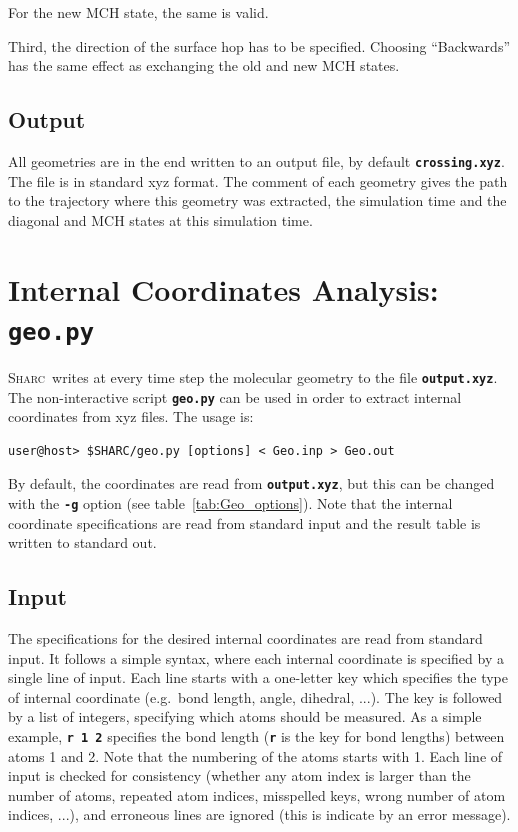 \documentclass[a4paper,10pt,DIV=15,openany]{scrbook}
\newcommand{\sharc}{\textsc{Sharc}}
\newcommand{\ttt}[1]{\textbf{\texttt{#1}}}
\begin{document}
For the new MCH state, the same is valid.

Third, the direction of the surface hop has to be specified. Choosing ``Backwards'' has the same effect as exchanging the old and new MCH states. 

\subsection{Output}

All geometries are in the end written to an output file, by default \ttt{crossing.xyz}. The file is in standard xyz format. The comment of each geometry gives the path to the trajectory where this geometry was extracted, the simulation time and the diagonal and MCH states at this simulation time. 







\section{Internal Coordinates Analysis: \ttt{geo.py}}\label{sec:geo.py}

\sharc\ writes at every time step the molecular geometry to the file \ttt{output.xyz}. The non-interactive script \ttt{geo.py} can be used in order to extract internal coordinates from xyz files. The usage is:
\begin{verbatim}
user@host> $SHARC/geo.py [options] < Geo.inp > Geo.out
\end{verbatim}
By default, the coordinates are read from \ttt{output.xyz}, but this can be changed with the \ttt{-g} option (see table~\ref{tab:Geo_options}). Note that the internal coordinate specifications are read from standard input and the result table is written to standard out. 

\subsection{Input}

The specifications for the desired internal coordinates are read from standard input. It follows a simple syntax, where each internal coordinate is specified by a single line of input. Each line starts with a one-letter key which specifies the type of internal coordinate (e.g.\ bond length, angle, dihedral, ...). The key is followed by a list of integers, specifying which atoms should be measured. As a simple example, \ttt{r 1 2} specifies the bond length (\ttt{r} is the key for bond lengths) between atoms 1 and 2. Note that the numbering of the atoms starts with 1. Each line of input is checked for consistency (whether any atom index is larger than the number of atoms, repeated atom indices, misspelled keys, wrong number of atom indices, ...), and erroneous lines are ignored (this is indicate by an error message).
\end{document}
